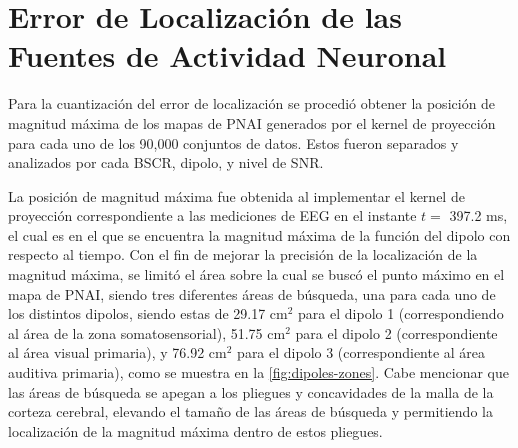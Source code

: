 \section{Error de Localización de las Fuentes de Actividad Neuronal}
\label{sec:methodology:estimator}

 Para la cuantización del error de localización se procedió obtener la posición de magnitud máxima de los mapas de PNAI generados por el kernel de proyección para cada uno de los 90,000 conjuntos de datos. 
Estos fueron separados y analizados por cada BSCR, dipolo, y nivel de SNR.

La posición de magnitud máxima fue obtenida al implementar el kernel de proyección correspondiente a las mediciones de EEG en el instante $t=$ 397.2 ms, el cual es en el que se encuentra la magnitud máxima de la función del dipolo con respecto al tiempo.
Con el fin de mejorar la precisión de la localización de la magnitud máxima, se limitó el área sobre la cual se buscó el punto máximo en el mapa de PNAI, siendo tres diferentes áreas de búsqueda, una para cada uno de los distintos dipolos, siendo estas de 29.17 cm$^2$ para el dipolo 1 (correspondiendo al área de la zona somatosensorial), 51.75 cm$^2$ para el dipolo 2 (correspondiente al área visual primaria), y 76.92 cm$^2$ para el dipolo 3 (correspondiente al área auditiva primaria), como se muestra en la \cref{fig:dipoles-zones}.
Cabe mencionar que las áreas de búsqueda se apegan a los pliegues y concavidades de la malla de la corteza cerebral, elevando el tamaño de las áreas de búsqueda y permitiendo la localización de la magnitud máxima dentro de estos pliegues.

